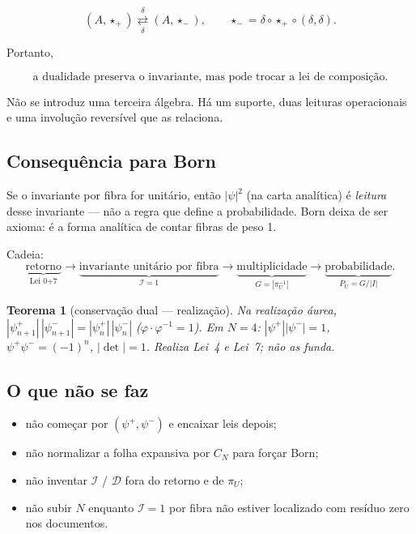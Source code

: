 \documentclass[11pt,a4paper]{article}
\newtheorem{teorema}{Teorema}
\begin{document}
$$
\boxed{
(A,\star_+)
\underset{\delta}{\overset{\delta}{\rightleftarrows}}
(A,\star_-),
\qquad
\star_-
=
\delta\circ\star_+\circ(\delta,\delta).
}
$$

Portanto,

$$
\boxed{
\text{a dualidade preserva o invariante,
mas pode trocar a lei de composição.}
}
$$

Não se introduz uma terceira álgebra. Há um suporte, duas leituras
operacionais e uma involução reversível que as relaciona.

\subsection{Consequência para Born}

Se o invariante por fibra for unitário, então $|\psi|^2$ (na carta analítica) é \emph{leitura}
desse invariante --- não a regra que define a probabilidade. Born deixa de ser axioma:
é a forma analítica de contar fibras de peso 1.

Cadeia:
\[
\underbrace{\text{retorno}}_{\text{Lei 0+7}}
\to
\underbrace{\text{invariante unitário por fibra}}_{\mathcal I=1}
\to
\underbrace{\text{multiplicidade}}_{G=|\pi_U^{-1}|}
\to
\underbrace{\text{probabilidade}}_{P_U=G/|I|}.
\]

\begin{teorema}[conservação dual --- realização]
\label{thm:par-dual}
Na realização áurea, $|\psi^+_{n+1}|\,|\psi^-_{n+1}|=|\psi^+_n|\,|\psi^-_n|$
($\varphi\cdot\varphi^{-1}=1$). Em $N=4$: $|\psi^+||\psi^-|=1$,
$\psi^+\psi^-=(-1)^n$, $|\det|=1$. Realiza Lei~4 e Lei~7; não as funda.
\end{teorema}

\subsection{O que não se faz}

\begin{itemize}[leftmargin=1.2em,itemsep=1pt]
  \item não começar por $(\psi^+,\psi^-)$ e encaixar leis depois;
  \item não normalizar a folha expansiva por $C_N$ para forçar Born;
  \item não inventar $\mathcal I$ / $\mathcal D$ fora do retorno e de $\pi_U$;
  \item não subir $N$ enquanto $\mathcal I=1$ por fibra não estiver
        localizado com resíduo zero nos documentos.
\end{itemize}
\end{document}
